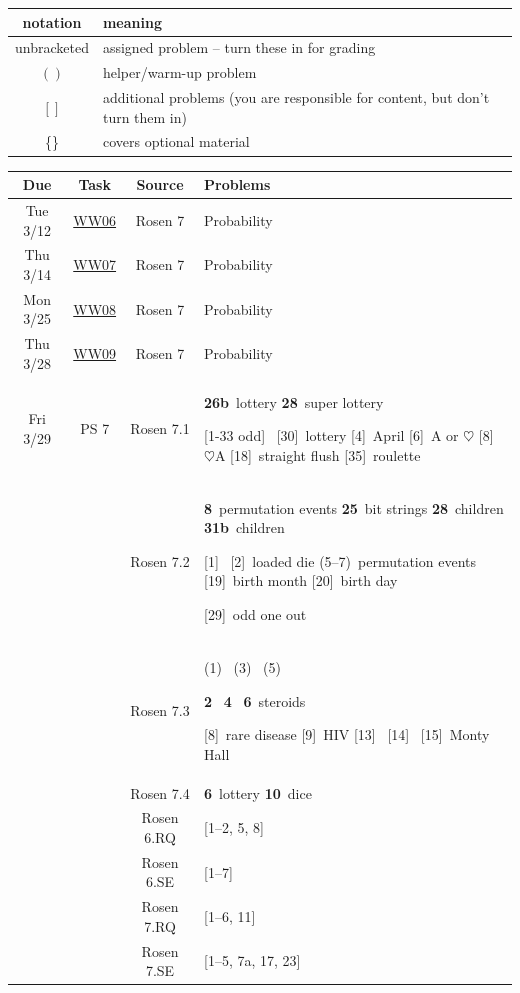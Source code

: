 \documentclass{scrartcl}\usepackage[]{graphicx}\usepackage[]{color}
\def\WW#1{\href{https://mathwebwork.cs.calvin.edu/webwork2/Math252-S19-Pruim/WW#1}{WW#1}}
\def\hwn#1{\relax}
\def\hwn#1{\ {\tiny (#1)}}
\def\hwn#1{$_{\mbox{\ \tiny #1}}$}
\def\hwn#1{~{\tiny #1}}
\newcommand{\helper}[2][\relax]{(#2)\hwn{#1}}
\newcommand{\extra}[2][\relax]{[#2]\hwn{#1}}
\newcommand{\mand}[2][\relax]{{\bf \large #2}\hwn{#1}}
\begin{document}
\begin{center}

\iftrue

\begin{longtable}{|c|l|}
  \hline
  notation & meaning \\
  \hline
  unbracketed & assigned problem -- turn these in for grading \\
  $()$ & helper/warm-up problem  \\
  $[]$ & additional problems (you are responsible for content, but don't turn them in) \\
  \{\} & covers optional material \\
  \hline
\end{longtable}
\fi

\bigskip


\begin{longtable}{|c|c|c|p{4.3in}|}
  \hline
  Due & Task & Source & Problems \\
  \hline\hline
  \endhead
	 Tue 3/12 & \WW{06} & Rosen 7 & Probability
	 \\
	   \hline
	 Thu 3/14 & \WW{07} & Rosen 7 & Probability
	 \\
	   \hline
	 Mon 3/25 & \WW{08} & Rosen 7 & Probability
	 \\
	   \hline
	 Thu 3/28 & \WW{09} & Rosen 7 & Probability
	 \\
	   \hline
	 Fri 3/29 & PS 7 & Rosen 7.1 &
	 \mand[lottery]{26b}
	 \mand[super lottery]{28}

	 \extra{1-33 odd}
	 \extra[lottery]{30}
	 \extra[April]{4}
	 \extra[A or $\heartsuit$]{6}
	 \extra[$\heartsuit$A]{8}
	 \extra[straight flush]{18}
	 \extra[roulette]{35}
	 \\
	 & & Rosen 7.2 &
	 \mand[permutation events]{8}
	 \mand[bit strings]{25}
	 \mand[children]{28}
	 \mand[children]{31b}

	 \extra{1}
	 \extra[loaded die]{2}
	 \helper[permutation events]{5--7}
	 \extra[birth month]{19}
	 \extra[birth day]{20}

	 \extra[odd one out]{29}
	 \\
	 & & Rosen 7.3 &
	 \helper{1}
	 \helper{3}
	 \helper{5}

	 \mand{2}
	 \mand{4}
	 \mand[steroids]{6}

	 \extra[rare disease]{8}
	 \extra[HIV]{9}
	 \extra{13}
	 \extra{14}
	 \extra[Monty Hall]{15}
	 \\
	 && Rosen 7.4 &
	 \mand[lottery]{6}
	 \mand[dice]{10}
	 \\
	 \hline
	  &  & Rosen 6.RQ & \extra{1--2, 5, 8} %
	 \\
	  &  & Rosen 6.SE & \extra{1--7} %
	 \\
	  &  & Rosen 7.RQ & \extra{1--6, 11}
	 \\
	  &  & Rosen 7.SE & \extra{1--5, 7a, 17, 23}
	 \\
	 \hline

\end{longtable}
\end{center}
\label{end}
\end{document}

